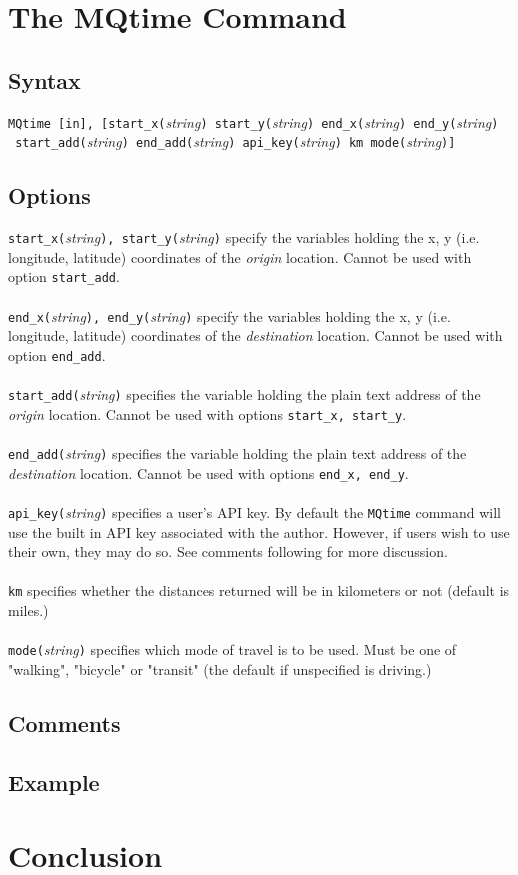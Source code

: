 \documentclass[12pt]{article}
\begin{document}
\section{The MQtime Command}

\subsection{Syntax}

\verb|MQtime [in], [start_x(|\textit{string}\verb|) start_y(|\textit{string}\verb|) end_x(|\textit{string}\verb|) end_y(|\textit{string}\verb|)| \\\verb| start_add(|\textit{string}\verb|) end_add(|\textit{string}\verb|) api_key(|\textit{string}\verb|) km mode(|\textit{string}\verb|)]|


\subsection{Options}
\verb|start_x(|\textit{string}\verb|), start_y(|\textit{string}\verb|)| specify the variables holding the x, y (i.e. longitude, latitude) coordinates of the \textit{origin} location. Cannot be used with option \verb|start_add|.
\\ \\
\verb|end_x(|\textit{string}\verb|), end_y(|\textit{string}\verb|)| specify the variables holding the x, y (i.e. longitude, latitude) coordinates of the \textit{destination} location. Cannot be used with option \verb|end_add|.
\\ \\
\verb|start_add(|\textit{string}\verb|)| specifies the variable holding the plain text address of the \textit{origin} location. Cannot be used with options \verb|start_x, start_y|.
\\ \\
\verb|end_add(|\textit{string}\verb|)| specifies the variable holding the plain text address of the \textit{destination} location. Cannot be used with options \verb|end_x, end_y|.
\\ \\
\verb|api_key(|\textit{string}\verb|)| specifies a user's API key. By default the \verb|MQtime| command will use the built in API key associated with the author. However, if users wish to use their own, they may do so. See comments following for more discussion.
\\ \\
\verb|km| specifies whether the distances returned will be in kilometers or not (default is miles.)
\\ \\
\verb|mode(|\textit{string}\verb|)| specifies which mode of travel is to be used. Must be one of "walking", "bicycle" or "transit" (the default if unspecified is driving.) 
\subsection{Comments}

\subsection{Example}

\section{Conclusion}
\end{document}
